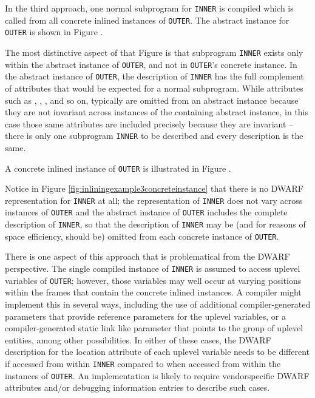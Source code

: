 In the third approach, one normal subprogram for \texttt{INNER} is
compiled which is called from all concrete inlined instances of
\texttt{OUTER}. The abstract instance for \texttt{OUTER} is shown in 
Figure .

The most distinctive aspect of that Figure is that subprogram
\texttt{INNER} exists only within the abstract instance of \texttt{OUTER},
and not in \texttt{OUTER}\textquoteright s concrete instance. In the abstract
instance of \texttt{OUTER}, the description of \texttt{INNER} has the full
complement of attributes that would be expected for a
normal subprogram. 
While attributes such as 
,
, 
,
and so on, typically are omitted
from 
an 
abstract instance because they are not invariant across
instances of the containing abstract instance, in this case
those same attributes are included precisely because they are
invariant -- there is only one subprogram \texttt{INNER} to be described
and every description is the same.

A concrete inlined instance of \texttt{OUTER} is illustrated in
Figure .

Notice in 
Figure \ref{fig:inliningexample3concreteinstance}
that there is no DWARF representation for
\texttt{INNER} at all; the representation of \texttt{INNER} does not vary across
instances of \texttt{OUTER} and the abstract instance of \texttt{OUTER} includes
the complete description of \texttt{INNER}, so that the description of
\texttt{INNER} may be (and for reasons of space efficiency, should be)
omitted from each 
concrete instance of \texttt{OUTER}.

There is one aspect of this approach that is problematical from
the DWARF perspective. The single compiled instance of \texttt{INNER}
is assumed to access up\dash level variables of \texttt{OUTER}; however,
those variables may well occur at varying positions within
the frames that contain the 
concrete inlined instances. A
compiler might implement this in several ways, including the
use of additional compiler-generated parameters that provide
reference parameters for the up\dash level variables, or a 
compiler-generated static link like parameter that points to the group
of up\dash level entities, among other possibilities. In either of
these cases, the DWARF description for the location attribute
of each uplevel variable needs to be different if accessed
from within \texttt{INNER} compared to when accessed from within the
instances of \texttt{OUTER}. An implementation is likely to require
vendor\dash specific DWARF attributes and/or debugging information
entries to describe such cases.

